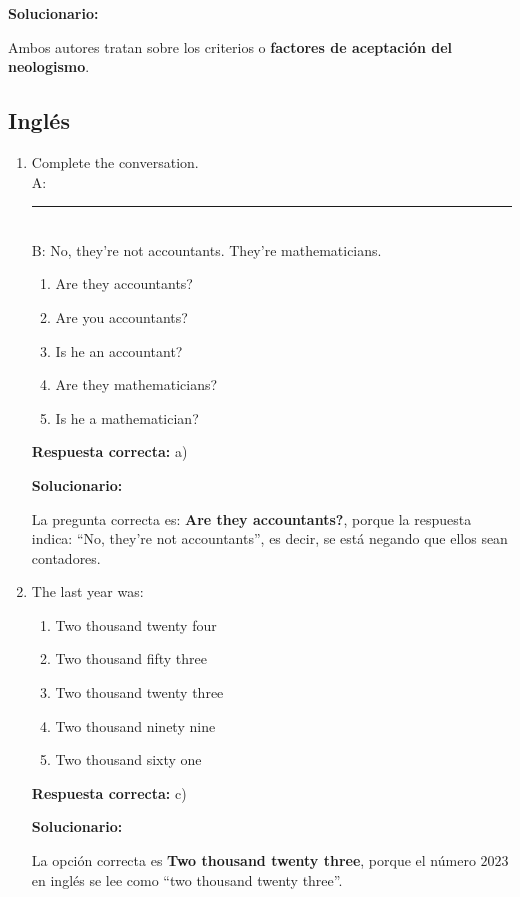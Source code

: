 \begin{enumerate}[resume]
	\vspace{2mm}
	\textbf{Solucionario:}
	
	Ambos autores tratan sobre los criterios o \textbf{factores de aceptación del neologismo}.
	
	\vspace{6mm}
	
\end{enumerate}

\subsection*{Inglés}

\begin{enumerate}[resume]

	
	\item Complete the conversation.\\
	A: \rule{6cm}{0.4pt}\\
	B: No, they’re not accountants. They’re mathematicians.
	\begin{enumerate}[label=\alph*)]
		\item Are they accountants?
		\item Are you accountants?
		\item Is he an accountant?
		\item Are they mathematicians?
		\item Is he a mathematician?
	\end{enumerate}
	\textbf{Respuesta correcta:} a)
	
	\vspace{2mm}
	\textbf{Solucionario:}
	
	La pregunta correcta es: \textbf{Are they accountants?}, porque la respuesta indica: “No, they’re not accountants”, es decir, se está negando que ellos sean contadores.
	
	\vspace{6mm}
	
	\item The last year was:
	\begin{enumerate}[label=\alph*)]
		\item Two thousand twenty four
		\item Two thousand fifty three
		\item Two thousand twenty three
		\item Two thousand ninety nine
		\item Two thousand sixty one
	\end{enumerate}
	\textbf{Respuesta correcta:} c)
	
	\vspace{2mm}
	\textbf{Solucionario:}
	
	La opción correcta es \textbf{Two thousand twenty three}, porque el número $2023$ en inglés se lee como “two thousand twenty three”.
	
	\vspace{6mm}
	
\end{enumerate}

